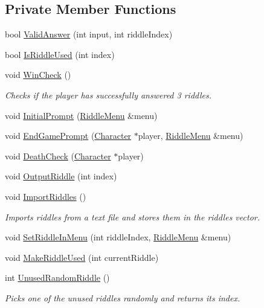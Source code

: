 \subsection*{Private Member Functions}
\begin{DoxyCompactItemize}
\item 
bool \hyperlink{classCodeCracker_aeddf29fcc2034f0acb41d41e0f755a3c}{Valid\-Answer} (int input, int riddle\-Index)
\item 
bool \hyperlink{classCodeCracker_a5540b8495c5f97f92cdb9b56a6005e6a}{Is\-Riddle\-Used} (int index)
\item 
void \hyperlink{classCodeCracker_a3177ddb9deb208ac462d55970b112626}{Win\-Check} ()
\begin{DoxyCompactList}\small\item\em Checks if the player has successfully answered 3 riddles. \end{DoxyCompactList}\item 
void \hyperlink{classCodeCracker_a879d3725e5602f6a5feddc39808f49b2}{Initial\-Prompt} (\hyperlink{classRiddleMenu}{Riddle\-Menu} \&menu)
\item 
void \hyperlink{classCodeCracker_a0f224858393bc3c597bd81babc87764b}{End\-Game\-Prompt} (\hyperlink{classCharacter}{Character} $\ast$player, \hyperlink{classRiddleMenu}{Riddle\-Menu} \&menu)
\item 
void \hyperlink{classCodeCracker_aa3e32b1d98fe1935315d02c832877e33}{Death\-Check} (\hyperlink{classCharacter}{Character} $\ast$player)
\item 
void \hyperlink{classCodeCracker_a02a6f156f051feca5691b8a4c4f44310}{Output\-Riddle} (int index)
\item 
void \hyperlink{classCodeCracker_a13ef45a98032d321c825e7a2c5439a33}{Import\-Riddles} ()
\begin{DoxyCompactList}\small\item\em Imports riddles from a text file and stores them in the riddles vector. \end{DoxyCompactList}\item 
void \hyperlink{classCodeCracker_a98c0c73ba7bc17e56a8a913ada09955f}{Set\-Riddle\-In\-Menu} (int riddle\-Index, \hyperlink{classRiddleMenu}{Riddle\-Menu} \&menu)
\item 
void \hyperlink{classCodeCracker_a23587f975c42657b90e78d00cf93bd38}{Make\-Riddle\-Used} (int current\-Riddle)
\item 
int \hyperlink{classCodeCracker_a55bebba723a92d780659f016e9e394e4}{Unused\-Random\-Riddle} ()
\begin{DoxyCompactList}\small\item\em Picks one of the unused riddles randomly and returns its index. \end{DoxyCompactList}\end{DoxyCompactItemize}
